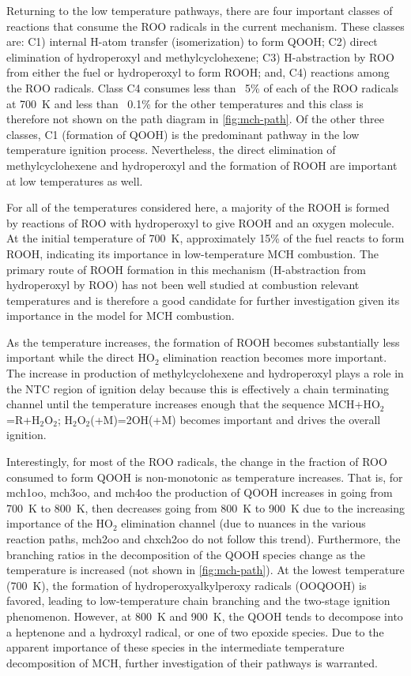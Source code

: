 \documentclass[12pt, letterpaper]{article}
\begin{document}
Returning to the low temperature pathways, there are four important classes of
reactions that consume the ROO radicals in the current mechanism. These classes
are: C1) internal H-atom transfer (isomerization) to form QOOH; C2) direct
elimination of hydroperoxyl and methylcyclohexene; C3) H-abstraction by ROO
from either the fuel or hydroperoxyl to form ROOH; and, C4) reactions among the
ROO radicals. Class C4 consumes less than ~5\% of each of the ROO radicals at
\SI{700}{\kelvin} and less than ~0.1\% for the other temperatures and this class is
therefore not shown on the path diagram in \autoref{fig:mch-path}. Of the other
three classes, C1 (formation of QOOH) is the predominant pathway in the low
temperature ignition process. Nevertheless, the direct elimination of
methylcyclohexene and hydroperoxyl and the formation of ROOH are important at
low temperatures as well.

For all of the temperatures considered here, a majority of the ROOH is formed
by reactions of ROO with hydroperoxyl to give ROOH and an oxygen molecule. At
the initial temperature of \SI{700}{\kelvin}, approximately 15\% of the fuel reacts to form
ROOH, indicating its importance in low-temperature MCH combustion. The primary
route of ROOH formation in this mechanism (H-abstraction from hydroperoxyl by
ROO) has not been well studied at combustion relevant temperatures
\cite{Zador2011} and is therefore a good candidate for further investigation
given its importance in the model for MCH combustion.

As the temperature increases, the formation of ROOH becomes substantially less
important while the direct HO$_2$ elimination reaction becomes more important.
The increase in production of methylcyclohexene and hydroperoxyl plays a role
in the NTC region of ignition delay because this is effectively a chain
terminating channel until the temperature increases enough that the sequence
MCH+HO$_2$=R+H$_2$O$_2$; H$_2$O$_2$(+M)=2OH(+M) becomes important and drives
the overall ignition.

Interestingly, for most of the ROO radicals, the change in the fraction of ROO
consumed to form QOOH is non-monotonic as temperature increases. That is, for
mch1oo, mch3oo, and mch4oo the production of QOOH increases in going from \SI{700}{\kelvin}
to \SI{800}{\kelvin}, then decreases going from \SI{800}{\kelvin} to \SI{900}{\kelvin} due to the increasing
importance of the HO$_2$ elimination channel (due to nuances in the various
reaction paths, mch2oo and chxch2oo do not follow this trend). Furthermore,
the branching ratios in the decomposition of the QOOH species change as the
temperature is increased (not shown in \autoref{fig:mch-path}). At the lowest
temperature (\SI{700}{\kelvin}), the formation of hydroperoxyalkylperoxy radicals (OOQOOH)
is favored, leading to low-temperature chain branching and the two-stage
ignition phenomenon. However, at \SI{800}{\kelvin} and \SI{900}{\kelvin}, the QOOH tends to decompose
into a heptenone and a hydroxyl radical, or one of two epoxide species. Due to
the apparent importance of these species in the intermediate temperature
decomposition of MCH, further investigation of their pathways is warranted.
\end{document}
